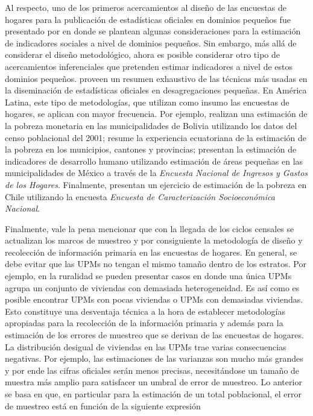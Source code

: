 \documentclass[12pt,spanish,]{book}
\begin{document}
Al respecto, uno de los primeros acercamientos al diseño de las encuestas de hogares para la publicación de estadísticas oficiales en dominios pequeños fue presentado por \textcite{Sinngh_Gambino_Mantel_1994} en donde se plantean algunas consideraciones para la estimación de indicadores sociales a nivel de dominios pequeños. Sin embargo, más allá de considerar el diseño metodológico, ahora es posible considerar otro tipo de acercamientos inferenciales que pretenden estimar indicadores a nivel de estos dominios pequeños. \textcite{Rao_Molina_2014} proveen un resumen exhaustivo de las técnicas más usadas en la diseminación de estadísticas oficiales en desagregaciones pequeñas. En América Latina, este tipo de metodologías, que utilizan como insumo las encuestas de hogares, se aplican con mayor frecuencia. Por ejemplo, \textcite{arias2007geography} realizan una estimación de la pobreza monetaria en las municipalidades de Bolivia utilizando los datos del censo poblacional del 2001; \textcite{araujo20071990} resume la experiencia ecuatoriana de la estimación de la pobreza en los municipios, cantones y provincias; \textcite{lopez2007poverty} presentan la estimación de indicadores de desarrollo humano utilizando estimación de áreas pequeñas en las municipalidades de México a través de la \emph{Encuesta Nacional de Ingresos y Gastos de los Hogares}. Finalmente, \textcite{Casas_Cordero_Valencia_Encina_Lahiri_2016} presentan un ejercicio de estimación de la pobreza en Chile utilizando la encuesta \emph{Encuesta de Caracterización Socioeconómica Nacional}.

Finalmente, vale la pena mencionar que con la llegada de los ciclos censales se actualizan los marcos de muestreo y por consiguiente la metodología de diseño y recolección de información primaria en las encuestas de hogares. En general, se debe evitar que las UPMs no tengan el mismo tamaño dentro de los estratos. Por ejemplo, en la ruralidad se pueden presentar casos en donde una única UPMs agrupa un conjunto de viviendas con demasiada heterogeneidad. Es así como es posible encontrar UPMs con pocas viviendas o UPMs con demasiadas viviendas. Esto constituye una desventaja técnica a la hora de establecer metodologías apropiadas para la recolección de la información primaria y además para la estimación de los errores de muestreo que se derivan de las encuestas de hogares. La distribución desigual de viviendas en las UPMs trae varias consecuencias negativas. Por ejemplo, las estimaciones de las varianzas son mucho más grandes y por ende las cifras oficiales serán menos precisas, necesitándose un tamaño de muestra más amplio para satisfacer un umbral de error de muestreo. Lo anterior se basa en que, en particular para la estimación de un total poblacional, el error de muestreo está en función de la siguiente expresión
\end{document}
